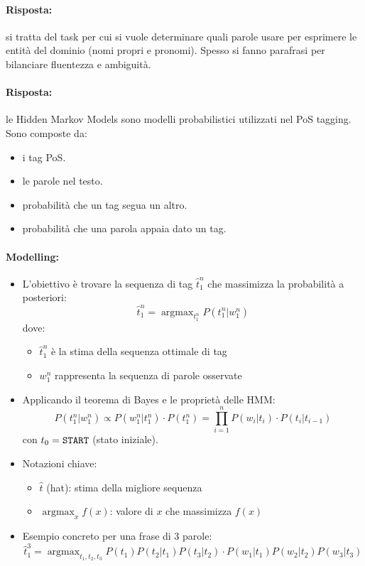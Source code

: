 \paragraph{Risposta:} si tratta del task per cui si vuole determinare quali parole usare per esprimere le entità del dominio (nomi propri e pronomi). Spesso si fanno parafrasi per bilanciare fluentezza e ambiguità. 


\paragraph{Risposta:} le Hidden Markov Models sono modelli probabilistici utilizzati nel PoS tagging. Sono composte da:

\begin{itemize}
  \item {} i tag PoS. 
  \item {} le parole nel testo. 
  \item {} probabilità che un tag segua un altro. 
  \item {} probabilità che una parola appaia dato un tag.
\end{itemize}

\paragraph{Modelling:}

\begin{itemize}
  \item L'obiettivo è trovare la sequenza di tag $\hat{t}_1^n$ che massimizza la probabilità a posteriori:
  \[
  \hat{t}_1^n = \operatorname{argmax}_{t_1^n} P(t_1^n|w_1^n)
  \]
  dove:
  \begin{itemize}
    \item $\hat{t}_1^n$ è la stima della sequenza ottimale di tag
    \item $w_1^n$ rappresenta la sequenza di parole osservate
  \end{itemize}

  \item Applicando il teorema di Bayes e le proprietà delle HMM:
  \[
  P(t_1^n|w_1^n) \propto P(w_1^n|t_1^n) \cdot P(t_1^n) = \prod_{i=1}^n P(w_i|t_i) \cdot P(t_i|t_{i-1})
  \]
  con $t_0 = \text{\texttt{START}}$ (stato iniziale).

  \item Notazioni chiave:
  \begin{itemize}
    \item $\hat{t}$ (hat): stima della migliore sequenza
    \item $\operatorname{argmax}_x f(x)$: valore di $x$ che massimizza $f(x)$
  \end{itemize}

  \item Esempio concreto per una frase di 3 parole:
  \[
  \hat{t}_1^3 = \operatorname{argmax}_{t_1,t_2,t_3} P(t_1)P(t_2|t_1)P(t_3|t_2) \cdot P(w_1|t_1)P(w_2|t_2)P(w_3|t_3)
  \]
\end{itemize}
